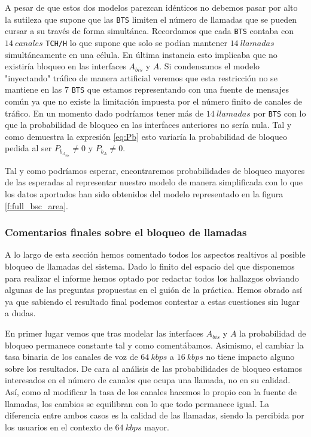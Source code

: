 \documentclass[10pt]{article}
\begin{document}
				A pesar de que estos dos modelos parezcan idénticos no debemos pasar por alto la sutileza que supone que las \texttt{BTS} limiten el número de llamadas que se pueden cursar a su través de forma simultánea. Recordamos que cada \texttt{BTS} contaba con $14\ canales$ \texttt{TCH/H} lo que supone que solo se podían mantener $14\ llamadas$ simultáneamente en una célula. En última instancia esto implicaba que no existiría bloqueo en las interfaces $A_{bis}$ y $A$. Si condensamos el modelo "inyectando" tráfico de manera artificial veremos que esta restricción no se mantiene en las $7$ \texttt{BTS} que estamos representando con una fuente de mensajes común ya que no existe la limitación impuesta por el número finito de canales de tráfico. En un momento dado podríamos tener más de $14\ llamadas$ por \texttt{BTS} con lo que la probabilidad de bloqueo en las interfaces anteriores no sería nula. Tal y como demuestra la expresión \ref{eq:Pb} esto variaría la probabilidad de bloqueo pedida al ser $P_{b_{A_{bis}}} \neq 0$ y $P_{b_A} \neq 0$.

				Tal y como podríamos esperar, encontraremos probabilidades de bloqueo mayores de las esperadas al representar nuestro modelo de manera simplificada con lo que los datos aportados han sido obtenidos del modelo representado en la figura \ref{f:full_bsc_area}.

			\subsubsection{Comentarios finales sobre el bloqueo de llamadas}
				A lo largo de esta sección hemos comentado todos los aspectos realtivos al posible bloqueo de llamadas del sistema. Dado lo finito del espacio del que disponemos para realizar el informe hemos optado por redactar todos los hallazgos obviando algunas de las preguntas propuestas en el guión de la práctica. Hemos obrado así ya que sabiendo el resultado final podemos contestar a estas cuestiones sin lugar a dudas.

				En primer lugar vemos que tras modelar las interfaces $A_{bis}$ y $A$ la probabilidad de bloqueo permanece constante tal y como comentábamos. Asimismo, el cambiar la tasa binaria de los canales de voz de $64\ kbps$ a $16\ kbps$ no tiene impacto alguno sobre los resultados. De cara al análisis de las probabilidades de bloqueo estamos interesados en el número de canales que ocupa una llamada, no en su calidad. Así, como al modificar la tasa de los canales hacemos lo propio con la fuente de llamadas, los cambios se equilibran con lo que todo permanece igual. La diferencia entre ambos casos es la calidad de las llamadas, siendo la percibida por los usuarios en el contexto de $64\ kbps$ mayor.
\end{document}
